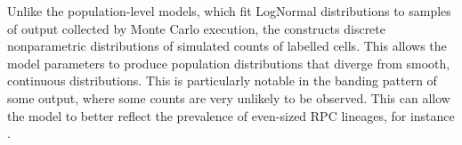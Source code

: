 Unlike the population-level models, which fit LogNormal distributions to samples of output collected by Monte Carlo execution, the  constructs discrete nonparametric distributions of simulated counts of labelled cells. This allows the model parameters to produce population distributions that diverge from smooth, continuous distributions. This is particularly notable in the banding pattern of some output, where some counts are very unlikely to be observed. This can allow the model to better reflect the prevalence of even-sized RPC lineages, for instance \cite{He2012}.